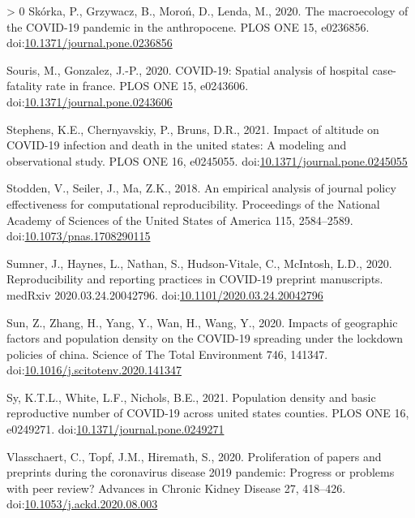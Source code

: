 \documentclass[]{elsarticle} %
\newlength{\cslhangindent}
\newenvironment{CSLReferences}[3] %
 {%
  \setlength{\parindent}{0pt}
  \ifodd #1 \everypar{\setlength{\hangindent}{\cslhangindent}}\ignorespaces\fi
  \ifnum #2 > 0
  \setlength{\parskip}{#2\baselineskip}
  \fi
 }%
 {}
\begin{document}
\begin{CSLReferences}{1}{0}
\leavevmode\hypertarget{ref-Skorka2020macroecology}{}%
Skórka, P., Grzywacz, B., Moroń, D., Lenda, M., 2020. The macroecology
of the COVID-19 pandemic in the anthropocene. PLOS ONE 15, e0236856.
doi:\href{https://doi.org/10.1371/journal.pone.0236856}{10.1371/journal.pone.0236856}

\leavevmode\hypertarget{ref-Souris2020covid}{}%
Souris, M., Gonzalez, J.-P., 2020. COVID-19: Spatial analysis of
hospital case-fatality rate in france. PLOS ONE 15, e0243606.
doi:\href{https://doi.org/10.1371/journal.pone.0243606}{10.1371/journal.pone.0243606}

\leavevmode\hypertarget{ref-Stephens2021impact}{}%
Stephens, K.E., Chernyavskiy, P., Bruns, D.R., 2021. Impact of altitude
on COVID-19 infection and death in the united states: A modeling and
observational study. PLOS ONE 16, e0245055.
doi:\href{https://doi.org/10.1371/journal.pone.0245055}{10.1371/journal.pone.0245055}

\leavevmode\hypertarget{ref-Stodden2018empirical}{}%
Stodden, V., Seiler, J., Ma, Z.K., 2018. An empirical analysis of
journal policy effectiveness for computational reproducibility.
Proceedings of the National Academy of Sciences of the United States of
America 115, 2584--2589.
doi:\href{https://doi.org/10.1073/pnas.1708290115}{10.1073/pnas.1708290115}

\leavevmode\hypertarget{ref-Sumner2020reproducibility}{}%
Sumner, J., Haynes, L., Nathan, S., Hudson-Vitale, C., McIntosh, L.D.,
2020. Reproducibility and reporting practices in COVID-19 preprint
manuscripts. medRxiv 2020.03.24.20042796.
doi:\href{https://doi.org/10.1101/2020.03.24.20042796}{10.1101/2020.03.24.20042796}

\leavevmode\hypertarget{ref-Sun2020impacts}{}%
Sun, Z., Zhang, H., Yang, Y., Wan, H., Wang, Y., 2020. Impacts of
geographic factors and population density on the COVID-19 spreading
under the lockdown policies of china. Science of The Total Environment
746, 141347.
doi:\href{https://doi.org/10.1016/j.scitotenv.2020.141347}{10.1016/j.scitotenv.2020.141347}

\leavevmode\hypertarget{ref-Sy2021population}{}%
Sy, K.T.L., White, L.F., Nichols, B.E., 2021. Population density and
basic reproductive number of COVID-19 across united states counties.
PLOS ONE 16, e0249271.
doi:\href{https://doi.org/10.1371/journal.pone.0249271}{10.1371/journal.pone.0249271}

\leavevmode\hypertarget{ref-Vlasschaert2020proliferation}{}%
Vlasschaert, C., Topf, J.M., Hiremath, S., 2020. Proliferation of papers
and preprints during the coronavirus disease 2019 pandemic: Progress or
problems with peer review? Advances in Chronic Kidney Disease 27,
418--426.
doi:\href{https://doi.org/10.1053/j.ackd.2020.08.003}{10.1053/j.ackd.2020.08.003}


\end{CSLReferences}
\end{document}
